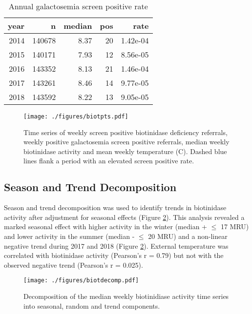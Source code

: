 \documentclass[review]{elsarticle}
\begin{document}
\begin{table}[ht]
\centering
\begin{tabular}{rrrrr}
  \hline
year & n & median & pos & rate \\ 
  \hline
2014 & 140678 & 8.37 &  20 & 1.42e-04 \\ 
  2015 & 140171 & 7.93 &  12 & 8.56e-05 \\ 
  2016 & 143352 & 8.13 &  21 & 1.46e-04 \\ 
  2017 & 143261 & 8.46 &  14 & 9.77e-05 \\ 
  2018 & 143592 & 8.22 &  13 & 9.05e-05 \\ 
   \hline
\end{tabular}
\caption{Annual galactosemia screen positive rate} 
\label{tab:galt_year}
\end{table}

\begin{figure}[htbp]
\centering
\texttt{[image: ./figures/biotpts.pdf]}
\caption{\label{fig:org5a134ef}Time series of weekly screen positive biotinidase deficiency referrals, weekly positive galactosemia screen positive referrals, median weekly biotinidase activity and mean weekly temperature (\degree{}C). Dashed blue lines flank a period with an elevated screen positive rate.}
\end{figure}


\clearpage

\subsection*{Season and Trend Decomposition}
\label{sec:org9ce3e8a}
Season and trend decomposition was used to identify trends in
biotinidase activity after adjustment for seasonal effects (Figure
\ref{fig:orgdb9f517}). This analysis revealed a marked seasonal effect with
higher activity in the winter (median + \(\le\) 17 MRU) and lower activity
in the summer (median - \(\le\) 20 MRU) and a non-linear negative trend
during 2017 and 2018 (Figure \ref{fig:orgdb9f517}). External temperature was
correlated with biotinidase activity (Pearson's r = 0.79) but not with
the observed negative trend (Pearson's r = 0.025).

\begin{figure}[htbp]
\centering
\texttt{[image: ./figures/biotdecomp.pdf]}
\caption{\label{fig:orgdb9f517}Decomposition of the median weekly biotinidiase activity time series into seasonal, random and trend components.}
\end{figure}
\end{document}

